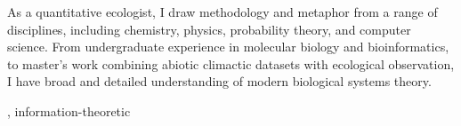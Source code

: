\documentclass[12pt]{article}
\begin{document}
As a quantitative ecologist, I draw 
methodology and metaphor from a range of disciplines, including 
chemistry, physics, probability theory, and computer science.
From undergraduate experience in molecular biology and 
bioinformatics, to master's work combining abiotic 
climactic datasets with ecological observation, I have broad
and detailed understanding of modern biological systems 
theory.






, information-theoretic 



\end{document}
